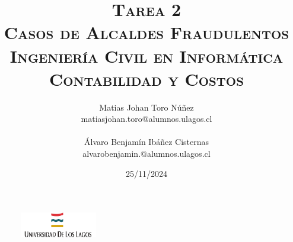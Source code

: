 \documentclass[letter,12pt]{article}
\begin{document}
	\begin{figure}
		\includegraphics[width=0.3\textwidth, left]{figures/download.png}
	\end{figure}
	\setlength{\unitlength}{1 cm} 
	\title{\scshape\Huge{Tarea 2}\\\vspace{0.5cm}
		\Large \textbf{Casos de Alcaldes Fraudulentos}\\\vspace{2cm}
		\Large Ingeniería Civil en Informática\\\vspace{1cm}
		\Large Contabilidad y Costos\\\vspace{2cm}}
	
	\author{
		Matias Johan Toro Núñez\\
		matiasjohan.toro@alumnos.ulagos.cl \\\\
		Álvaro Benjamín Ibáñez Cisternas\\
		alvarobenjamin.@alumnos.ulagos.cl
	\vspace{3cm}}
	
	\date{25/11/2024}
	\maketitle
	\thispagestyle{empty}
	\clearpage
	\setcounter{page}{1}
	
	\tableofcontents
	\newpage
	
	
\end{document}
